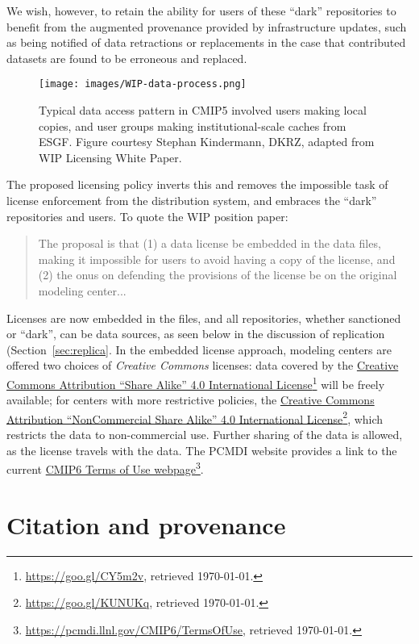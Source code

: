 \documentclass[gmd,manuscript]{copernicus}
\newcommand{\pllabel}[1]{\label{p-#1}\linelabel{l-#1}}
\newcommand{\urlref}[2] {\href{#1}{#2}\footnote{\url{#1}, retrieved \today.}}
\begin{document}
We wish, however, to retain the ability for users of these ``dark''
repositories to benefit from the augmented provenance provided by
infrastructure updates, such as being notified of data retractions or
replacements in the case that contributed datasets are found to be
erroneous and replaced.

\begin{figure*}
  \begin{center}
    \texttt{[image: images/WIP-data-process.png]}
  \end{center}
  \caption{Typical data access pattern in CMIP5 involved users making
    local copies, and user groups making institutional-scale caches
    from ESGF. Figure courtesy Stephan Kindermann, DKRZ, adapted from
    WIP Licensing White Paper.}
  \label{fig:dark}
\end{figure*}

The proposed licensing policy inverts this and removes the impossible
task of license enforcement from the distribution system, and embraces
the ``dark'' repositories and users. To quote the WIP position paper:

\begin{quote}
  The proposal is that (1) a data license be embedded in the data
  files, making it impossible for users to avoid having a copy of the
  license, and (2) the onus on defending the provisions of the license
  be on the original modeling center...
\end{quote}

\pllabel{RC2-27}
Licenses are now embedded in the files, and all repositories, whether
sanctioned or ``dark'', can be data sources, as seen below in the
discussion of replication (Section~\ref{sec:replica}.
\pllabel{RC2-30}
In the embedded license approach, modeling centers are offered two
choices of \emph{Creative Commons} licenses: data covered by the
\urlref{https://goo.gl/CY5m2v}{Creative Commons Attribution ``Share
  Alike'' 4.0 International License} will be freely available; for
centers with more restrictive policies, the
\urlref{https://goo.gl/KUNUKq}{Creative Commons Attribution
  ``NonCommercial Share Alike'' 4.0 International License}, which
restricts the data to non-commercial use. Further sharing of the data
is allowed, as the license travels with the data. The PCMDI website
provides a link to the current
\urlref{https://pcmdi.llnl.gov/CMIP6/TermsOfUse}{CMIP6 Terms of Use
  webpage}.

\section{Citation and provenance}
\label{sec:cite}
\end{document}
